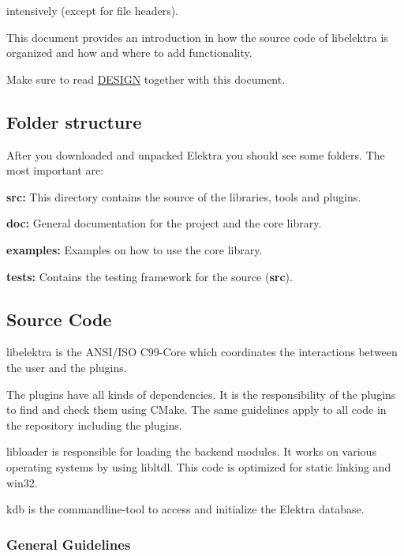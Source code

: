 intensively (except for file headers).

This document provides an introduction in how the source code of libelektra is organized and how and where to add functionality.

Make sure to read \hyperlink{doc_DESIGN_md}{D\+E\+S\+I\+GN} together with this document.

\subsection*{Folder structure}

After you downloaded and unpacked Elektra you should see some folders. The most important are\+:


\begin{DoxyItemize}
\item {\bfseries src\+:} This directory contains the source of the libraries, tools and plugins.
\item {\bfseries doc\+:} General documentation for the project and the core library.
\item {\bfseries examples\+:} Examples on how to use the core library.
\item {\bfseries tests\+:} Contains the testing framework for the source ({\bfseries src}).
\end{DoxyItemize}

\subsection*{Source Code}

libelektra is the A\+N\+S\+I/\+I\+SO C99-\/\+Core which coordinates the interactions between the user and the plugins.

The plugins have all kinds of dependencies. It is the responsibility of the plugins to find and check them using C\+Make. The same guidelines apply to all code in the repository including the plugins.

{\ttfamily libloader} is responsible for loading the backend modules. It works on various operating systems by using {\ttfamily libltdl}. This code is optimized for static linking and win32.

kdb is the commandline-\/tool to access and initialize the Elektra database.

\subsubsection*{General Guidelines}

